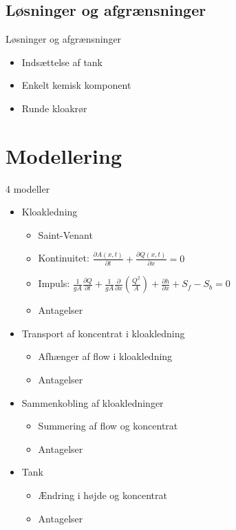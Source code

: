 \subsection{Løsninger og afgrænsninger}
\begin{frame}{Løsninger og afgrænsninger}{}
\vfill\vfill\centering
\begin{itemize}
	\item<1-> Indsættelse af tank
	\vspace{4mm}
	\item<2-> Enkelt kemisk komponent
	\vspace{4mm}
	\item<3-> Runde kloakrør
\end{itemize}
\vfill\vfill	
\end{frame}

\section{Modellering}

\begin{frame}{4 modeller}{}
	\vfill\vfill\centering
\begin{itemize}
	\item<1-> Kloakledning
	\begin{itemize}
		\item<2-> Saint-Venant
		\item<2-> Kontinuitet: \hspace{15mm} $\frac{\partial A(x,t)}{\partial t} + \frac{\partial Q(x,t)}{\partial x}=0$ 
		\item<2-> Impuls: \hspace{21mm} $\frac{1}{gA} \frac{\partial Q}{\partial t} +\frac{1}{gA}\frac{\partial}{\partial x} \left( \frac{Q^2}{A} \right) + \frac{\partial h}{\partial x} + S_f - S_b = 0$
		\item<2-> Antagelser
	\end{itemize}
	\vspace{4mm}
	\item<1-> Transport af koncentrat i kloakledning
	\begin{itemize}
		\item<3-> Afhænger af flow i kloakledning
		\item<3-> Antagelser
	\end{itemize}
	\vspace{4mm}
	\item<1-> Sammenkobling af kloakledninger
	\begin{itemize}
		\item<4-> Summering af flow og koncentrat
		\item<4-> Antagelser
	\end{itemize}
	\vspace{4mm}
	\item<1-> Tank
	\begin{itemize}
		\item<5-> Ændring i højde og koncentrat
		\item<5-> Antagelser
	\end{itemize}	 
\end{itemize}
\vfill\vfill		
\end{frame}


